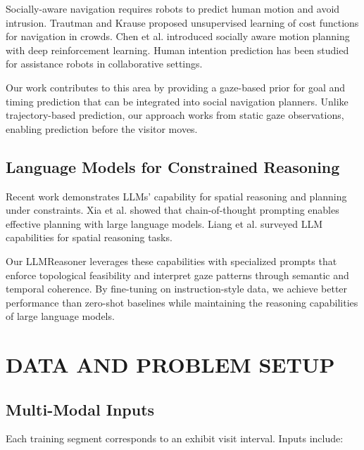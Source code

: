 \documentclass[letterpaper]{article}
\begin{document}
Socially-aware navigation requires robots to predict human motion and avoid intrusion. Trautman and Krause proposed unsupervised learning of cost functions for navigation in crowds. Chen et al. introduced socially aware motion planning with deep reinforcement learning. Human intention prediction has been studied for assistance robots in collaborative settings.

Our work contributes to this area by providing a gaze-based prior for goal and timing prediction that can be integrated into social navigation planners. Unlike trajectory-based prediction, our approach works from static gaze observations, enabling prediction before the visitor moves.

\subsection{Language Models for Constrained Reasoning}

Recent work demonstrates LLMs' capability for spatial reasoning and planning under constraints. Xia et al. showed that chain-of-thought prompting enables effective planning with large language models. Liang et al. surveyed LLM capabilities for spatial reasoning tasks.

Our LLMReasoner leverages these capabilities with specialized prompts that enforce topological feasibility and interpret gaze patterns through semantic and temporal coherence. By fine-tuning on instruction-style data, we achieve better performance than zero-shot baselines while maintaining the reasoning capabilities of large language models.

\section{DATA AND PROBLEM SETUP}

\subsection{Multi-Modal Inputs}

Each training segment corresponds to an exhibit visit interval. Inputs include:
\end{document}
